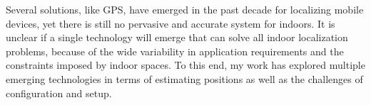\documentclass[10pt]{article}
\begin{document}
Several solutions, like GPS, have emerged in the past decade for localizing mobile devices, yet there is still no pervasive and accurate system for indoors.  It is unclear if a single technology will emerge that can solve all indoor localization problems, because of the wide variability in application requirements and the constraints imposed by indoor spaces.  To this end, my work has explored multiple emerging technologies in terms of estimating positions as well as the challenges of configuration and setup.



\end{document}
